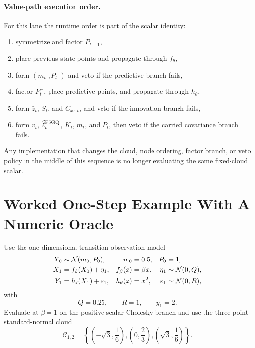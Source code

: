 \paragraph{Value-path execution order.}
For this lane the runtime order is part of the scalar identity:
\begin{enumerate}[leftmargin=0.28in]
  \item symmetrize and factor \(P_{t-1}\),
  \item place previous-state points and propagate through \(f_\theta\),
  \item form \((m_t^-,P_t^-)\) and veto if the predictive branch fails,
  \item factor \(P_t^-\), place predictive points, and propagate through
  \(h_\theta\),
  \item form \(\bar z_t\), \(S_t\), and \(C_{xz,t}\), and veto if the
  innovation branch fails,
  \item form \(v_t\), \(\widehat\ell_t^{\rm FSGQ}\), \(K_t\), \(m_t\), and
  \(P_t\), then veto if the carried covariance branch fails.
\end{enumerate}
Any implementation that changes the cloud, node ordering, factor branch, or
veto policy in the middle of this sequence is no longer evaluating the same
fixed-cloud scalar.

\section{Worked One-Step Example With A Numeric Oracle}
\label{sec:bf-hd-sgqf-worked-example}

Use the one-dimensional transition-observation model
\begin{align}
  X_0 &\sim \mathcal{N}(m_0,P_0),
  &m_0&=0.5,
  &P_0&=1,
  \label{eq:bf-hd-sgqf-example-initial}\\
  X_1 &= f_\beta(X_0)+\eta_1,
  &f_\beta(x)&=\beta x,
  &\eta_1&\sim \mathcal{N}(0,Q),
  \label{eq:bf-hd-sgqf-example-transition}\\
  Y_1 &= h_\theta(X_1)+\varepsilon_1,
  &h_\theta(x)&=x^2,
  &\varepsilon_1&\sim \mathcal{N}(0,R),
  \label{eq:bf-hd-sgqf-example-observation}
\end{align}
with
\begin{equation}
  Q=0.25,
  \qquad
  R=1,
  \qquad
  y_1=2.
  \label{eq:bf-hd-sgqf-example-QRy}
\end{equation}
Evaluate at \(\beta=1\) on the positive scalar Cholesky branch and use the
three-point standard-normal cloud
\begin{equation}
  \mathcal C_{1,2}
  =
  \left\{
  \left(-\sqrt3,\frac16\right),
  \left(0,\frac23\right),
  \left(\sqrt3,\frac16\right)
  \right\}.
  \label{eq:bf-hd-sgqf-example-cloud}
\end{equation}

